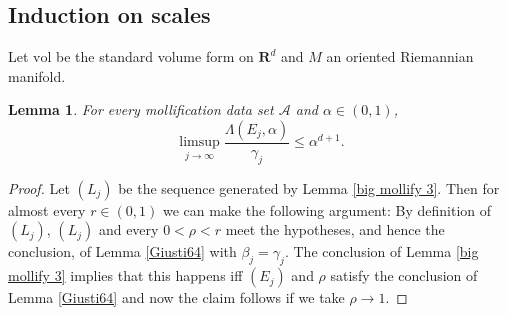 \documentclass[reqno,12pt,letterpaper]{amsart}
\newcommand{\RR}{\mathbf{R}}
\newcommand{\vol}{\mathrm{vol}}
\newtheorem{lemma}[theorem]{Lemma}
\theoremstyle{definition}
\numberwithin{equation}{section}
\begin{document}
\subsection{Induction on scales}
Let $\vol$ be the standard volume form on $\RR^d$ and $M$ an oriented Riemannian manifold.

\begin{lemma}\label{induction 1}
For every mollification data set $\mathcal A$ and $\alpha \in (0, 1)$,
$$\limsup_{j \to \infty} \frac{\Lambda(E_j, \alpha)}{\gamma_j} \leq \alpha^{d + 1}.$$
\end{lemma}
\begin{proof}
Let $(L_j)$ be the sequence generated by Lemma \ref{big mollify 3}.
Then for almost every $r \in (0, 1)$ we can make the following argument:
By definition of $(L_j)$, $(L_j)$ and every $0 < \rho < r$ meet the hypotheses, and hence the conclusion, of Lemma \ref{Giusti64} with $\beta_j = \gamma_j$.
The conclusion of Lemma \ref{big mollify 3} implies that this happens iff $(E_j)$ and $\rho$ satisfy the conclusion of Lemma \ref{Giusti64} and now the claim follows if we take $\rho \to 1$.
\end{proof}
\end{document}
